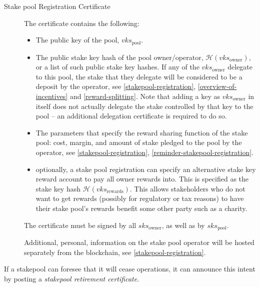 \documentclass[11pt,a4paper]{article}
\begin{document}
\begin{description}
\item[Stake pool Registration Certificate]
The certificate contains the following:

\begin{itemize}
\item
  The public key of the pool, \(vks_\text{pool}\).
\item
  The public stake key hash of the pool owner/operator,
  \(\mathcal{H}(vks_\text{owner})\), or a list of such public stake key
  hashes. If any of the \(vks_\text{owner}\) delegate to this pool, the
  stake that they delegate will be considered to be a deposit by the
  operator, see \ref{stakepool-registration},
  \ref{overview-of-incentives} and \ref{reward-splitting}. Note that
  adding a key as \(vks_\text{owner}\) in itself does not actually
  delegate the stake controlled by that key to the pool -- an additional
  delegation certificate is required to do so.
\item
  The parameters that specify the reward sharing function of the stake
  pool: cost, margin, and amount of stake pledged to the pool by the
  operator, see \ref{stakepool-registration},
  \ref{reminder-stakepool-registration}.
\item
  optionally, a stake pool registration can specify an alternative stake
  key reward account to pay all owner rewards into. This is specified as
  the stake key hash \(\mathcal{H}(vks_\text{rewards})\). This allows
  stakeholders who do not want to get rewards (possibly for regulatory
  or tax reasons) to have their stake pool's rewards benefit some other
  party such as a charity.
\end{itemize}

The certificate must be signed by all \(sks_\text{owner}\), as well as
by \(sks_\text{pool}\).

Additional, personal, information on the stake pool operator will be
hosted separately from the blockchain, see \ref{stakepool-registration}.
\end{description}

If a stakepool can foresee that it will cease operations, it can
announce this intent by posting a \emph{stakepool retirement
certificate}.
\end{document}
